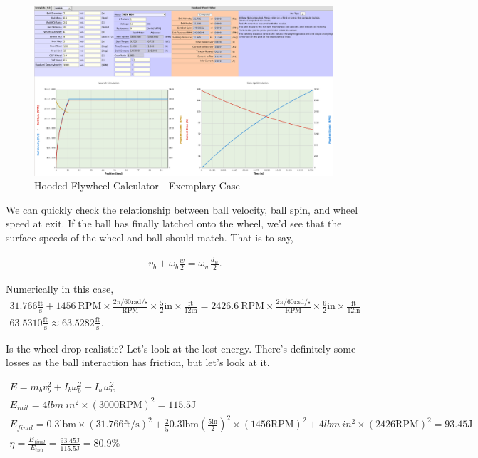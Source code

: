 \documentclass[10pt,letterpaper]{article}
\begin{document}
	\begin{figure}[H]
		\includegraphics[width=0.99\textwidth]{validation/hood_EC_A.png}
		\caption{Hooded Flywheel Calculator - Exemplary Case}
	\end{figure}

	We can quickly check the relationship between ball velocity, ball spin, and wheel speed at exit. If the ball has finally latched onto the wheel, we'd see that the surface speeds of the wheel and ball should match. That is to say,

	\begin{align}
		v_b + \omega_b \frac{w}{2} = \omega_w \frac{d_w}{2}.
	\end{align}

	Numerically in this case,
	\begin{align}
		31.766 \frac{\text{ft}}{\text{s}} + 1456 \ \text{RPM} \times \frac{2 \pi / 60 \text{rad/s}}{\text{RPM}} \times \frac{5}{2} \text{in} \times \frac{\text{ft}}{12 \text{in}} = 2426.6 \ \text{RPM} \times \frac{2 \pi / 60 \text{rad/s}}{\text{RPM}} \times \frac{6}{2} \text{in} \times \frac{\text{ft}}{12 \text{in}} \\
		63.5310 \frac{\text{ft}}{\text{s}} \approx 63.5282 \frac{\text{ft}}{\text{s}} .
	\end{align}

	Is the wheel drop realistic? Let's look at the lost energy. There's definitely some losses as the ball interaction has friction, but let's look at it.

	\begin{align}
		E = m_b v_b^2 + I_b \omega_b^2 + I_w \omega_w^2 \\
		E_{init} = 4 \text{$lbm\ in^2$} \times (3000 \text{RPM})^2 = 115.5 \text{J} \\
		E_{final} = 0.3 \text{lbm} \times (31.766 \text{ft/s})^2 + \frac{2}{5} 0.3 \text{lbm} (\frac{5 \text{in}}{2})^2 \times (1456 \text{RPM})^2 + 4 \text{$lbm\ in^2$} \times (2426 \text{RPM})^2 = 93.45 \text{J} \\
		\eta = \frac{E_{final}}{E_{init}} = \frac{93.45 \text{J}}{115.5 \text{J}} = 80.9 \% 
	\end{align}
\end{document}
